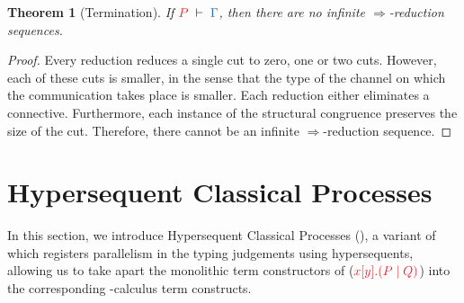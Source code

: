 \documentclass[draft,submission,copyright,creativecommons]{eptcs}
\newtheorem{theorem}{Theorem}
\begin{document}
\begin{theorem}[Termination]\label{thm:cp-termination}
  If $\seq[P]{\Gamma}$, then there are no infinite $\Longrightarrow$-reduction sequences.
\end{theorem}\vspace*{-0.75\baselineskip}%
\begin{proof}
  Every reduction reduces a single cut to zero, one or two cuts. However, each of these cuts is smaller, in the sense that the type of the channel on which the communication takes place is smaller. Each reduction either eliminates a connective. Furthermore, each instance of the structural congruence preserves the size of the cut. Therefore, there cannot be an infinite $\Longrightarrow$-reduction sequence.
\end{proof}


\section{Hypersequent Classical Processes}
\label{sec:hcp}

In this section, we introduce Hypersequent Classical Processes (\hcp), a variant of \cp which registers parallelism in the typing judgements using hypersequents, allowing us to take apart the monolithic term constructors of \cp (\eg $\tm{\cpSend{x}{y}{P}{Q}}$) into the corresponding \textpi-calculus term constructs. 
\end{document}
